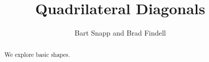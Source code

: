 \documentclass[nooutcomes]{ximera}
\title{Quadrilateral Diagonals}
\author{Bart Snapp and Brad Findell}
\begin{document}
\begin{abstract}
  We explore basic shapes.
\end{abstract}
\maketitle 






\end{document}
